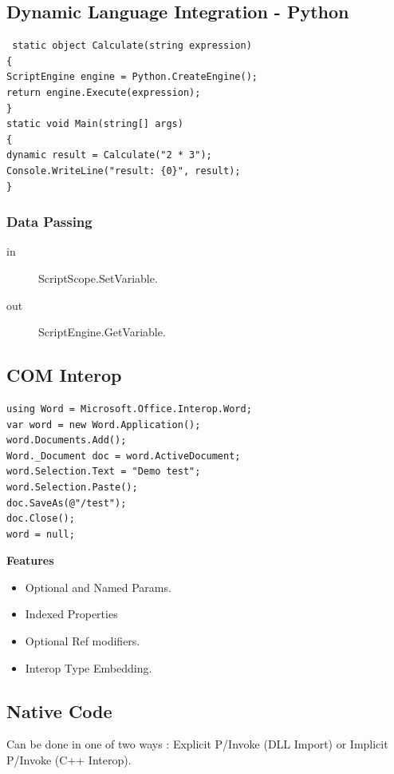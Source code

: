 \documentclass[a4paper,10pt]{scrartcl}
\begin{document}
\subsection{Dynamic Language Integration - Python}
\begin{lstlisting}
 static object Calculate(string expression)
{
ScriptEngine engine = Python.CreateEngine();
return engine.Execute(expression);
}
static void Main(string[] args)
{
dynamic result = Calculate("2 * 3");
Console.WriteLine("result: {0}", result);
}

\end{lstlisting}

\subsubsection{Data Passing}
\begin{description}
\item [in] ScriptScope.SetVariable.
\item [out] ScriptEngine.GetVariable.
\end{description}

\subsection{COM Interop}
\begin{lstlisting}[caption=COM Interop Example]
 using Word = Microsoft.Office.Interop.Word;
var word = new Word.Application();
word.Documents.Add();
Word._Document doc = word.ActiveDocument;
word.Selection.Text = "Demo test";
word.Selection.Paste();
doc.SaveAs(@"/test");
doc.Close();
word = null;

\end{lstlisting}

\textbf{Features}
\begin{itemize}
 \item Optional and Named Params.
 \item Indexed Properties
 \item Optional Ref modifiers.
 \item Interop Type Embedding.
\end{itemize}

\subsection{Native Code}
Can be done in one of two ways : Explicit P/Invoke (DLL Import) or Implicit P/Invoke (C++ Interop).\\
\end{document}
